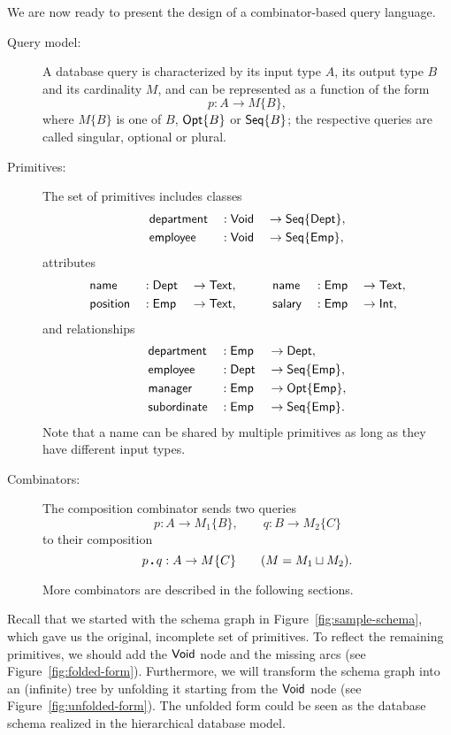 We are now ready to present the design of a combina\-tor-based query language.



\begin{description}
\item[Query model:]
A database query is characterized by its input type $A$, its output type $B$
and its cardinality $M$, and can be represented as a function of the form
\begin{equation*}
    p : A \to M\{B\},
\end{equation*}
where $M\{B\}$ is one of $B$, $\mathsf{Opt}{\left\{B\right\}}$ or $\mathsf{Seq}{\left\{B\right\}}$; the respective queries
are called singular, optional or plural.

\item[Primitives:]
The set of primitives includes classes
\begin{alignat*}{3}
    & \mathsf{department} && : \mathsf{Void} && \to \mathsf{Seq}{\left\{\mathsf{Dept}\right\}}, \\
    & \mathsf{employee} && : \mathsf{Void} && \to \mathsf{Seq}{\left\{\mathsf{Emp}\right\}},
\end{alignat*}
attributes
\begin{alignat*}{6}
    & \mathsf{name} && : \mathsf{Dept} && \to \mathsf{Text}, \qquad
    && \mathsf{name} && : \mathsf{Emp} && \to \mathsf{Text}, \\
    & \mathsf{position} && : \mathsf{Emp} && \to \mathsf{Text}, \qquad
    && \mathsf{salary} && : \mathsf{Emp} && \to \mathsf{Int},
\end{alignat*}
and relationships
\begin{alignat*}{3}
    & \mathsf{department} && : \mathsf{Emp} && \to \mathsf{Dept}, \\
    & \mathsf{employee} && : \mathsf{Dept} && \to \mathsf{Seq}{\left\{\mathsf{Emp}\right\}}, \\
    & \mathsf{manager} && : \mathsf{Emp} && \to \mathsf{Opt}{\left\{\mathsf{Emp}\right\}}, \\
    & \mathsf{subordinate} && : \mathsf{Emp} && \to \mathsf{Seq}{\left\{\mathsf{Emp}\right\}}.
\end{alignat*}
Note that a name can be shared by multiple primitives as long as they have
different input types.

\item[Combinators:]
The composition combinator sends two queries
\begin{equation*}
    p : A \to M_1\{B\}, \qquad
    q : B \to M_2\{C\}
\end{equation*}
to their composition
\begin{equation*}
    p\,\boldsymbol{.}\,q : A \to M\{C\} \qquad (M = M_1 \sqcup M_2).
\end{equation*}

More combinators are described in the following sections.
\end{description}



Recall that we started with the schema graph in
Figure~\ref{fig:sample-schema}, which gave us the original, incomplete set of
primitives.  To reflect the remaining primitives, we should add the $\mathsf{Void}$
node and the missing arcs (see Figure~\ref{fig:folded-form}).
Furthermore, we will transform the schema graph into an (infinite) tree by
unfolding it starting from the $\mathsf{Void}$ node (see
Figure~\ref{fig:unfolded-form}).   The unfolded form could be seen as the
database schema realized in the hierarchical data\-base model.

